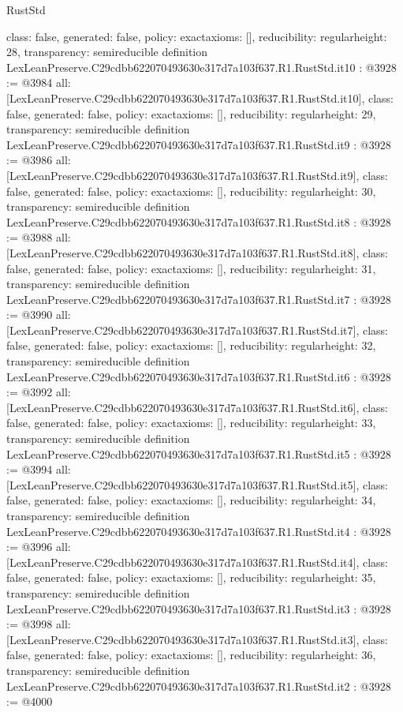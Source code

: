 \begin{lexlean}{RustStd}
\begin{coremodule}
{  class: false,
  generated: false,
  policy: exact{axioms: []},
  reducibility: regular{height: 28},
  transparency: semireducible
}
definition LexLeanPreserve.C29cdbb622070493630e317d7a103f637.R1.RustStd.it10 : @3928 := @3984 {
  all: [LexLeanPreserve.C29cdbb622070493630e317d7a103f637.R1.RustStd.it10],
  class: false,
  generated: false,
  policy: exact{axioms: []},
  reducibility: regular{height: 29},
  transparency: semireducible
}
definition LexLeanPreserve.C29cdbb622070493630e317d7a103f637.R1.RustStd.it9 : @3928 := @3986 {
  all: [LexLeanPreserve.C29cdbb622070493630e317d7a103f637.R1.RustStd.it9],
  class: false,
  generated: false,
  policy: exact{axioms: []},
  reducibility: regular{height: 30},
  transparency: semireducible
}
definition LexLeanPreserve.C29cdbb622070493630e317d7a103f637.R1.RustStd.it8 : @3928 := @3988 {
  all: [LexLeanPreserve.C29cdbb622070493630e317d7a103f637.R1.RustStd.it8],
  class: false,
  generated: false,
  policy: exact{axioms: []},
  reducibility: regular{height: 31},
  transparency: semireducible
}
definition LexLeanPreserve.C29cdbb622070493630e317d7a103f637.R1.RustStd.it7 : @3928 := @3990 {
  all: [LexLeanPreserve.C29cdbb622070493630e317d7a103f637.R1.RustStd.it7],
  class: false,
  generated: false,
  policy: exact{axioms: []},
  reducibility: regular{height: 32},
  transparency: semireducible
}
definition LexLeanPreserve.C29cdbb622070493630e317d7a103f637.R1.RustStd.it6 : @3928 := @3992 {
  all: [LexLeanPreserve.C29cdbb622070493630e317d7a103f637.R1.RustStd.it6],
  class: false,
  generated: false,
  policy: exact{axioms: []},
  reducibility: regular{height: 33},
  transparency: semireducible
}
definition LexLeanPreserve.C29cdbb622070493630e317d7a103f637.R1.RustStd.it5 : @3928 := @3994 {
  all: [LexLeanPreserve.C29cdbb622070493630e317d7a103f637.R1.RustStd.it5],
  class: false,
  generated: false,
  policy: exact{axioms: []},
  reducibility: regular{height: 34},
  transparency: semireducible
}
definition LexLeanPreserve.C29cdbb622070493630e317d7a103f637.R1.RustStd.it4 : @3928 := @3996 {
  all: [LexLeanPreserve.C29cdbb622070493630e317d7a103f637.R1.RustStd.it4],
  class: false,
  generated: false,
  policy: exact{axioms: []},
  reducibility: regular{height: 35},
  transparency: semireducible
}
definition LexLeanPreserve.C29cdbb622070493630e317d7a103f637.R1.RustStd.it3 : @3928 := @3998 {
  all: [LexLeanPreserve.C29cdbb622070493630e317d7a103f637.R1.RustStd.it3],
  class: false,
  generated: false,
  policy: exact{axioms: []},
  reducibility: regular{height: 36},
  transparency: semireducible
}
definition LexLeanPreserve.C29cdbb622070493630e317d7a103f637.R1.RustStd.it2 : @3928 := @4000 {
}
\end{coremodule}
\end{lexlean}

